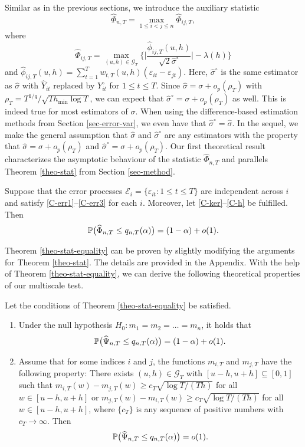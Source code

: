 Similar as in the previous sections, we introduce the auxiliary statistic 
\[ \widehat{\Phi}_{n,T} = \max_{1 \le i < j \le n} \widehat{\Phi}_{ij,T}, \]
where
\[ \widehat{\Phi}_{ij,T} = \max_{(u,h) \in \mathcal{G}_T} \Big\{ \Big| \frac{\widehat{\phi}_{ij,T}(u,h)} {\sqrt{2}\widehat{\sigma}^\circ} \Big| - \lambda(h) \Big \} \]
and $\widehat{\phi}_{ij,T}(u,h) = \sum_{t=1}^T w_{t,T}(u,h) (\varepsilon_{it} - \varepsilon_{jt})$. Here, $\widehat{\sigma}^\circ$ is the same estimator as $\widehat{\sigma}$ with $\widehat{Y}_{it}$ replaced by $Y_{it}^\circ$ for $1 \le t \le T$. Since $\widehat{\sigma} = \sigma + o_p(\rho_T)$ with $\rho_T = T^{1/q}/\sqrt{T h_{\min} \log T}$, we can expect that $\widehat{\sigma}^\circ = \sigma + o_p(\rho_T)$ as well. This is indeed true for most estimators of $\sigma$. When using the difference-based estimation methods from Section \ref{sec-error-var}, we even have that $\widehat{\sigma}^\circ = \widehat{\sigma}$. In the sequel, we make the general assumption that $\widehat{\sigma}$ and $\widehat{\sigma}^\circ$ are any estimators with the property that $\widehat{\sigma} = \sigma + o_p(\rho_T)$ and $\widehat{\sigma}^\circ = \sigma + o_p(\rho_T)$. Our first theoretical result characterizes the asymptotic behaviour of the statistic $\widehat{\Phi}_{n,T}$ and parallels Theorem \ref{theo-stat} from Section \ref{sec-method}. 
\begin{theorem}\label{theo-stat-equality}
Suppose that the error processes $\mathcal{E}_i = \{ \varepsilon_{it}: 1 \le t \le T \}$ are independent across $i$ and satisfy \ref{C-err1}--\ref{C-err3} for each $i$. Moreover, let \ref{C-ker}--\ref{C-h} be fulfilled. Then 
\[ \mathbb{P} \big( \widehat{\Phi}_{n,T} \le q_{n,T}(\alpha) \big) = (1 - \alpha) + o(1). \]
\end{theorem}
Theorem \ref{theo-stat-equality} can be proven by slightly modifying the arguments for Theorem \ref{theo-stat}. The details are provided in the Appendix. With the help of Theorem \ref{theo-stat-equality}, we can derive the following theoretical properties of our multiscale test. 
\begin{prop}\label{prop-test-equality}
Let the conditions  of Theorem \ref{theo-stat-equality} be satisfied. 
\begin{enumerate}[label=(\alph*),leftmargin=0.75cm]
\item Under the null hypothesis $H_0: m_1 = m_2 = \ldots = m_n$, it holds that 
\[ \mathbb{P} \big( \widehat{\Psi}_{n,T} \le q_{n,T}(\alpha) \big) = (1 - \alpha) + o(1). \]
\item Assume that for some indices $i$ and $j$, the functions $m_{i,T}$ and $m_{j,T}$ have the following property: There exists $(u,h) \in \mathcal{G}_T$ with $[u-h,u+h] \subseteq [0,1]$ such that $m_{i,T}(w) - m_{j,T}(w) \ge c_T \sqrt{\log T/(Th)}$ for all $w \in [u-h,u+h]$ or $m_{j,T}(w) - m_{i,T}(w) \ge c_T \sqrt{\log T/(Th)}$ for all $w \in [u-h,u+h]$, where $\{c_T\}$ is any sequence of positive numbers with $c_T \rightarrow \infty$. Then 
\[ \mathbb{P} \big( \widehat{\Psi}_{n,T} \le q_{n,T}(\alpha) \big) = o(1). \]
\end{enumerate}
\end{prop}
